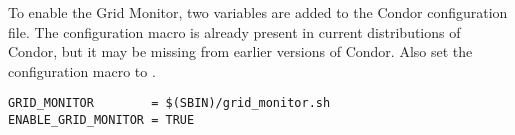 To enable the Grid Monitor,
two variables are added to the Condor configuration file.
The configuration macro 
is already present in current distributions of Condor,
but it may be missing from earlier versions of Condor.
Also set the configuration macro 
to .

\begin{verbatim}
GRID_MONITOR        = $(SBIN)/grid_monitor.sh
ENABLE_GRID_MONITOR = TRUE
\end{verbatim}

